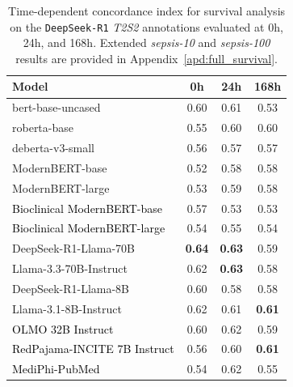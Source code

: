 \begin{table}[!tbp]
\centering
{
\begin{tabular}{lccc}
\toprule
\textbf{Model} & 0h & 24h & 168h \\
\midrule
bert-base-uncased       & 0.60 & 0.61 & 0.53 \\
roberta-base            & 0.55 & 0.60 & 0.60 \\
deberta-v3-small        & 0.56 & 0.57 & 0.57 \\
ModernBERT-base         & 0.52 & 0.58 & 0.58 \\
ModernBERT-large        & 0.53 & 0.59 & 0.58 \\
\textcolor{black}{Bioclinical ModernBERT-base} & 0.57 & 0.53 & 0.53 \\
\textcolor{black}{Bioclinical ModernBERT-large} & 0.54 & 0.55 & 0.54 \\
DeepSeek-R1-Llama-70B   & \textbf{0.64} & \textbf{0.63} & 0.59 \\
Llama-3.3-70B-Instruct  & 0.62 & \textbf{0.63} & 0.58 \\
DeepSeek-R1-Llama-8B    & 0.60 & 0.58 & 0.58 \\
Llama-3.1-8B-Instruct   & 0.62 & 0.61 & \textbf{0.61} \\
\textcolor{black}{OLMO 32B Instruct} & 0.60 & 0.62 & 0.59 \\
\textcolor{black}{RedPajama-INCITE 7B Instruct} & 0.56 & 0.60 & \textbf{0.61} \\
\textcolor{black}{MediPhi-PubMed} & 0.54 & 0.62 & 0.55 \\
\bottomrule
\end{tabular}
}
\caption{
Time-dependent concordance index for survival analysis on the \texttt{DeepSeek-R1} \textit{T2S2} annotations evaluated at 0h, 24h, and 168h. Extended \textit{sepsis-10} and \textit{sepsis-100} results are provided in Appendix~\ref{apd:full_survival}.
}
\label{tab:concordance_t2s2_only}
\end{table}
